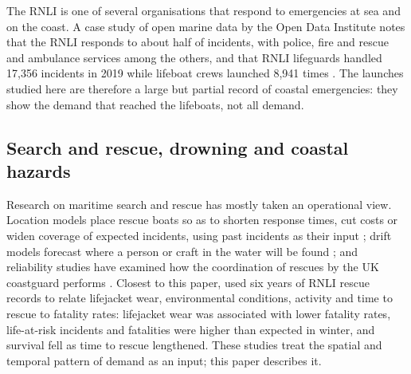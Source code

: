 \documentclass[11pt,a4paper]{article}
\begin{document}
The RNLI is one of several organisations that respond to emergencies at sea and on the coast. A case study of open marine data by the Open Data Institute notes that the RNLI responds to about half of incidents, with police, fire and rescue and ambulance services among the others, and that RNLI lifeguards handled 17,356 incidents in 2019 while lifeboat crews launched 8,941 times \citep{odi2021}. The launches studied here are therefore a large but partial record of coastal emergencies: they show the demand that reached the lifeboats, not all demand.

\subsection{Search and rescue, drowning and coastal hazards}
Research on maritime search and rescue has mostly taken an operational view. Location models place rescue boats so as to shorten response times, cut costs or widen coverage of expected incidents, using past incidents as their input \citep{razi2016,akbari2018}; drift models forecast where a person or craft in the water will be found \citep{breivik2008}; and reliability studies have examined how the coordination of rescues by the UK coastguard performs \citep{norrington2008}. Closest to this paper, \citet{pitman2019} used six years of RNLI rescue records to relate lifejacket wear, environmental conditions, activity and time to rescue to fatality rates: lifejacket wear was associated with lower fatality rates, life-at-risk incidents and fatalities were higher than expected in winter, and survival fell as time to rescue lengthened. These studies treat the spatial and temporal pattern of demand as an input; this paper describes it.
\end{document}
